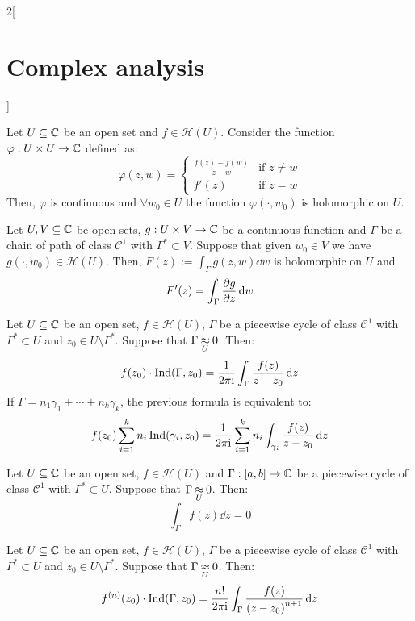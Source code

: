 \documentclass[../../../main_math.tex]{subfiles}
\begin{document}
\begin{multicols}{2}[\section{Complex analysis}]
  \begin{lemma}
    Let $U\subseteq\mathbb{C}$ be an open set and $f\in\mathcal{H}(U)$. Consider the function $\varphi:U\times U\rightarrow\mathbb{C}$ defined as:
    $$
      \varphi(z,w)=
      \begin{cases}
        \frac{f(z)-f(w)}{z-w} & \text{if }z\ne w \\
        f'(z)                 & \text{if }z=w
      \end{cases}
    $$
    Then, $\varphi$ is continuous and $\forall w_0\in U$ the function $\varphi(\cdot,w_0)$ is holomorphic on $U$.
  \end{lemma}
  \begin{lemma}
    Let $U,V\subseteq\mathbb{C}$ be open sets, $g:U\times V\rightarrow\mathbb{C}$ be a continuous function and $\Gamma$ be a chain of path of class $\mathcal{C}^1$ with $\Gamma^*\subset V$. Suppose that given $w_0\in V$ we have $g(\cdot,w_0)\in\mathcal{H}(U)$. Then, $F(z):=\int_\Gamma g(z,w)\dd{w}$ is holomorphic on $U$ and $$F'(z)=\int_\Gamma\pdv{g}{z}(z,w)\dd{w}$$
  \end{lemma}
  \begin{theorem}
    Let $U\subseteq\mathbb{C}$ be an open set, $f\in\mathcal{H}(U)$, $\Gamma$ be a piecewise cycle of class $\mathcal{C}^1$ with $\Gamma^*\subset U$ and $z_0\in U\setminus\Gamma^*$. Suppose that $\Gamma\mathbin{\underset{U}{\approx}} 0$. Then:
    $$f(z_0)\cdot\operatorname{Ind}(\Gamma,z_0)=\frac{1}{2\pi\mathrm{i}}\int_\Gamma\frac{f(z)}{z-z_0}\dd{z}$$
    If $\Gamma=n_1\gamma_1+\cdots+n_k\gamma_k$, the previous formula is equivalent to:
    $$f(z_0)\sum_{i=1}^kn_i\operatorname{Ind}(\gamma_i,z_0)=\frac{1}{2\pi\mathrm{i}}\sum_{i=1}^kn_i\int_{\gamma_i}\frac{f(z)}{z-z_0}\dd{z}$$
  \end{theorem}
  \begin{theorem}
    Let $U\subseteq \mathbb{C}$ be an open set, $f\in\mathcal{H}(U)$ and $\Gamma:[a,b]\rightarrow\mathbb{C}$ be a piecewise cycle of class $\mathcal{C}^1$ with $\Gamma^*\subset U$. Suppose that $\Gamma\mathbin{\underset{U}{\approx}} 0$. Then: $$\int_\Gamma f(z)\dd{z}=0$$
  \end{theorem}
  \begin{corollary}
    Let $U\subseteq\mathbb{C}$ be an open set, $f\in\mathcal{H}(U)$, $\Gamma$ be a piecewise cycle of class $\mathcal{C}^1$ with $\Gamma^*\subset U$ and $z_0\in U\setminus\Gamma^*$. Suppose that $\Gamma\mathbin{\underset{U}{\approx}} 0$. Then:
    $$f^{(n)}(z_0)\cdot\operatorname{Ind}(\Gamma,z_0)=\frac{n!}{2\pi\mathrm{i}}\int_\Gamma\frac{f(z)}{{(z-z_0)}^{n+1}}\dd{z}$$
  \end{corollary}

\end{multicols}
\end{document}
